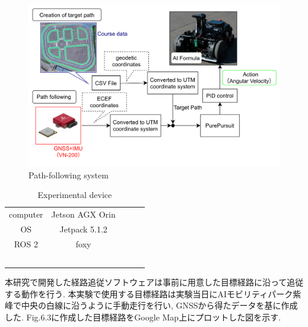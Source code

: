 \begin{figure}[H]
  \centering
 \includegraphics[keepaspectratio, scale=0.2]
      {images/system.png}
 \caption{Path-following system}
 \label{fig:Path-following system}
\end{figure}

\begin{table}[H]
     \centering
     \caption{Experimental device}
     \begin{tabular}{cclll}
     \cline{1-2}
     computer             & Jetson AGX Orin &  &  &  \\
     OS                   & Jetpack 5.1.2   &  &  &  \\
     ROS 2                & foxy            &  &  &  \\
                          &                 &  &  &  \\
                          &                 &  &  &  \\
                          &                 &  &  &  \\
     \multicolumn{1}{l}{} &                 &  &  &  \\
     \multicolumn{1}{l}{} &                 &  &  & 
     \end{tabular}
\end{table}

本研究で開発した経路追従ソフトウェアは事前に用意した目標経路に沿って追従する動作を行う.
本実験で使用する目標経路は実験当日にAIモビリティパーク紫峰で中央の白線に沿うように手動走行を行い, GNSSから得たデータを基に作成した.
Fig.6.3に作成した目標経路をGoogle Map上にプロットした図を示す.

